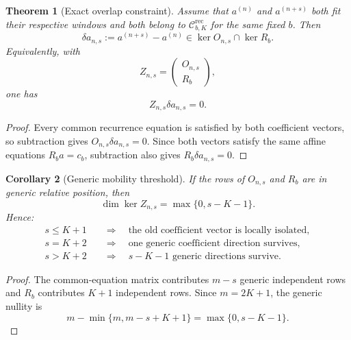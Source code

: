\documentclass[11pt]{amsart}
\numberwithin{equation}{section}
\theoremstyle{plain}
\newtheorem{theorem}{Theorem}[section]
\newtheorem{corollary}[theorem]{Corollary}
\theoremstyle{definition}
\theoremstyle{remark}
\begin{document}
\begin{theorem}[Exact overlap constraint]
\label{thm:exact_overlap_constraint}
Assume that $a^{(n)}$ and $a^{(n+s)}$ both fit their respective windows and both belong to $\mathcal C^{\mathrm{rec}}_{b,K}$ for the same fixed $b$.  Then
\begin{equation}
\delta a_{n,s}:=a^{(n+s)}-a^{(n)}
\in
\ker O_{n,s}\cap\ker R_b.
\label{eq:overlap_kernel_intersection}
\end{equation}
Equivalently, with
\begin{equation}
Z_{n,s}
=
\begin{pmatrix}
O_{n,s}\\
R_b
\end{pmatrix},
\label{eq:stacked_overlap_matrix}
\end{equation}
one has
\begin{equation}
Z_{n,s}\delta a_{n,s}=0.
\label{eq:stacked_overlap_null}
\end{equation}
\end{theorem}

\begin{proof}
Every common recurrence equation is satisfied by both coefficient vectors, so subtraction gives $O_{n,s}\delta a_{n,s}=0$.  Since both vectors satisfy the same affine equations $R_ba=c_b$, subtraction also gives $R_b\delta a_{n,s}=0$.
\end{proof}

\begin{corollary}[Generic mobility threshold]
\label{cor:generic_mobility_threshold}
If the rows of $O_{n,s}$ and $R_b$ are in generic relative position, then
\begin{equation}
\dim\ker Z_{n,s}
=
\max\{0,s-K-1\}.
\label{eq:generic_mobility_dimension}
\end{equation}
Hence:
\begin{align}
s\leq K+1
&\quad\Longrightarrow\quad
\text{the old coefficient vector is locally isolated},
\label{eq:rigid_stride_small}\\
s=K+2
&\quad\Longrightarrow\quad
\text{one generic coefficient direction survives},
\label{eq:critical_stride_one_direction}\\
s>K+2
&\quad\Longrightarrow\quad
s-K-1\text{ generic directions survive}.
\label{eq:large_stride_directions}
\end{align}
\end{corollary}

\begin{proof}
The common-equation matrix contributes $m-s$ generic independent rows and $R_b$ contributes $K+1$ independent rows.  Since $m=2K+1$, the generic nullity is
\begin{equation}
m-\min\{m,m-s+K+1\}
=\max\{0,s-K-1\}.
\end{equation}
\end{proof}
\end{document}
